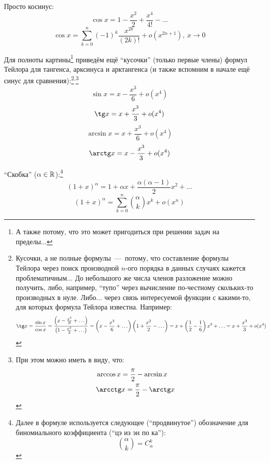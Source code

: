 \documentclass[a4paper,12pt]{article}
\begin{document}
  Просто косинус:
  \[
    \cos x = 1 - \frac{x^2}{2} + \frac{x^4}{4!} - \ldots
  \]
  \begin{equation}\label{eq:cos}
    \cos x = \sum_{k = 0}^n (-1)^k \frac{x^{2k}}{(2k)!} + o(x^{2n + 1}),\ x \to 0
  \end{equation}

  Для полноты картины\footnote{
    А также потому, что это может пригодиться при решении задач на пределы...
  } приведём ещё ``кусочки'' (только первые члены) формул Тейлора для тангенса, арксинуса и арктангенса (и также вспомним в начале ещё синус для сравнения):\footnote{
    Кусочки, а не полные формулы~---~потому, что составление формулы Тейлора через поиск производной $n$-ого порядка в данных случаях кажется проблематичным...
    До небольшого же числа членов разложение можно получить, либо, например, ``тупо'' через вычисление по-честному скольких-то производных в нуле.
    Либо... через связь интересуемой функции с какими-то, для которых формула Тейлора известна.
    Например:
    \begin{equation*}
    \begin{split}
      \tg x = \frac{\sin x}{\cos x} = \frac{\left(x - \frac{x^3}{3!} + \ldots\right)}{\left(1 - \frac{x^2}{2} + \ldots\right)}
        = \left(x - \frac{x^3}{6} + \ldots\right)\left(1 + \frac{x^2}{2} - \ldots\right)
        = x + \left(\frac{1}{2} - \frac{1}{6}\right) x^3 + \ldots
        = x + \frac{x^3}{3} + o(x^4)
    \end{split}
    \end{equation*}
  }\textsuperscript{,}\footnote{  %
    При этом можно иметь в виду, что:
    \[
      \begin{aligned}
        &\arccos x = \frac{\pi}{2} - \arcsin x\\
        &\arcctg x = \frac{\pi}{2} - \arctg x
      \end{aligned}
    \]
  }
  \[
    \sin x = x - \frac{x^3}{6} + o(x^4)
  \]
  \begin{equation}\label{eq:easy-tg}
    \tg x = x + \frac{x^3}{3} + o(x^4)
  \end{equation}
  \begin{equation}\label{eq:easy-arcsin}
    \arcsin x = x + \frac{x^3}{6} + o(x^4)
  \end{equation}
  \begin{equation}\label{eq:easy-arctg}
    \arctg x = x - \frac{x^3}{3} + o(x^4)
  \end{equation}

  ``Скобка'' ($\alpha \in \operatorname{\mathbb R}$):\footnote{
    Далее в формуле используется следующее (``продвинутое'') обозначение для биномиального коэффициента (``цэ из эн по ка''):
    \[
      \binom{\alpha}{k} = C_{\alpha}^k
    \]
  }
  \[
    (1 + x)^{\alpha} = 1 + \alpha x + \frac{\alpha (\alpha - 1)}{2} x^2 + \ldots
  \]
  \begin{equation}\label{eq:brace}
    (1 + x)^{\alpha} = \sum_{k = 0}^n \binom{\alpha}{k} x^k + o(x^n)
  \end{equation}
\end{document}
